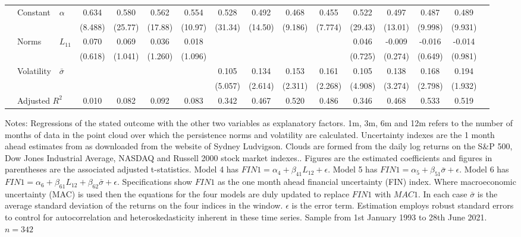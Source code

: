 \documentclass{article}
\begin{document}
\begin{sidewaystable}
\begin{center}
\begin{tabular}{ll l c c c c c c c c c c c c c}
             & Constant & $\alpha$ & 0.634&0.580&0.562&0.554&0.528&0.492&0.468&0.455&0.522&0.497&0.487&0.489\\
            &&&(8.488)&(25.77)&(17.88)&(10.97)&(31.34)&(14.50)&(9.186)&(7.774)&(29.43)&(13.01)&(9.998)&(9.931)\\
            & Norms & $L_{11}$ & 0.070&0.069&0.036&0.018&&&&&0.046&-0.009&-0.016&-0.014\\
            &&&(0.618)&(1.041)&(1.260)&(1.096)&&&&&(0.725)&(0.274)&(0.649)&(0.981)\\
            & Volatility & $\bar{\sigma}$&&&&&0.105&0.134&0.153&0.161&0.105&0.138&0.168&0.194\\
            &&&&&&&(5.057)&(2.614)&(2.311)&(2.268)&(4.908)&(3.274)&(2.798)&(1.932)\\
            & \multicolumn{2}{l}{Adjusted $R^2$}&0.010&0.082&0.092&0.083&0.342&0.467&0.520&0.486&0.346&0.468&0.533&0.519\\
             \hline
        \end{tabular}
    \end{center}
\footnotesize{Notes: Regressions of the stated outcome with the other two variables as explanatory factors. 1m, 3m, 6m and 12m refers to the number of months of data in the point cloud over which the persistence norms and volatility are calculated. Uncertainty indexes are the 1 month ahead estimates from \cite{jurado2015measuring} as downloaded from the website of Sydney Ludvigson. Clouds are formed from the daily log returns on the S\&P 500, Dow Jones Industrial Average, NASDAQ and Russell 2000 stock market indexes.. Figures are the estimated coefficients and figures in parentheses are the associated \cite{newey1987simple} adjusted t-statistics. Model 4 has $FIN1 = \alpha_4 + \beta_{41}L_{12} + \epsilon$. Model 5 has $FIN1 = \alpha_5 + \beta_{51}\bar{\sigma} + \epsilon$. Model 6 has $FIN1 = \alpha_6 + \beta_{61}L_{12} + \beta_{62}\bar{\sigma}+\epsilon$. Specifications show $FIN1$ as the one month ahead financial uncertainty (FIN) index. Where macroeconomic uncertainty (MAC) is used then the equations for the four models are duly updated to replace $FIN1$ with $MAC1$. In each case $\bar{\sigma}$ is the average standard deviation of the returns on the four indices in the window. $\epsilon$ is the error term. Estimation employs \cite{newey1987simple} robust standard errors to control for autocorrelation and heteroskedasticity inherent in these time series. Sample from 1st January 1993 to 28th June 2021. $n=342$}
\end{sidewaystable}
\end{document}
